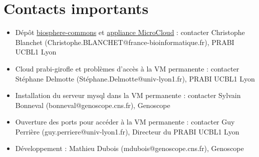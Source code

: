 \section {Contacts importants}
\begin{itemize}
	\item Dépôt \href{https://github.com/IFB-ElixirFr/biosphere-commons}{biosphere-commons} et \href{https://biosphere.france-bioinformatique.fr/catalogue/}{appliance MicroCloud} : contacter Christophe Blanchet (Christophe.BLANCHET@france-bioinformatique.fr), PRABI UCBL1 Lyon
    \item Cloud prabi-girofle et problèmes d'accès à la VM permanente : contacter Stéphane Delmotte (Stéphane.Delmotte@univ-lyon1.fr), PRABI UCBL1 Lyon
    \item Installation du serveur mysql dans la VM permanente : contacter Sylvain Bonneval (bonneval@genoscope.cns.fr), Genoscope
    \item Ouverture des ports pour accéder à la VM permanente : contacter Guy Perrière (guy.perriere@univ-lyon1.fr), Directeur du PRABI UCBL1 Lyon
    \item Développement : Mathieu Dubois (mdubois@genoscope.cns.fr), Genoscope
\end{itemize}